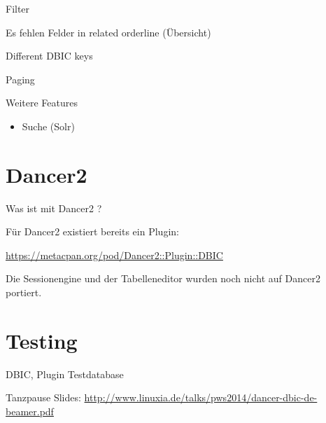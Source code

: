 Filter

Es fehlen Felder in related orderline (Übersicht)

Different DBIC keys

Paging

\begin{frame}{Weitere Features}
\begin{itemize}
\item Suche (Solr)
\end{itemize}
\end{frame}

\section{Dancer2}

Was ist mit Dancer2 ?

Für Dancer2 existiert bereits ein Plugin:

\url{https://metacpan.org/pod/Dancer2::Plugin::DBIC}

Die Sessionengine und der Tabelleneditor wurden noch nicht auf Dancer2 portiert.

\section{Testing}
DBIC, Plugin
Testdatabase

\begin{frame}{Tanzpause}
Slides:
\url{http://www.linuxia.de/talks/pws2014/dancer-dbic-de-beamer.pdf}
\end{frame}



